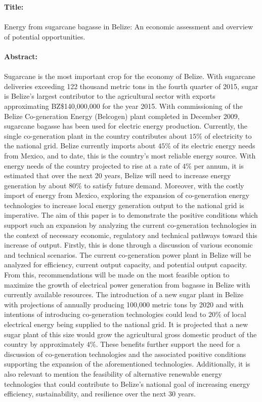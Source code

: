 \documentclass[12pt]{article}
\begin{document}
\noindent
\textbf{Title:} \\
\\Energy from sugarcane bagasse in Belize: An economic assessment and overview of potential opportunities. \\ \\
\noindent\textbf{Abstract:}\\
\\Sugarcane is the most important crop for the economy of Belize. With sugarcane deliveries exceeding 122 thousand metric tons in the fourth quarter of 2015, sugar is Belize's largest contributor to the agricultural sector with exports approximating BZ\$140,000,000 for the year 2015. With commissioning of the Belize Co-generation Energy (Belcogen) plant completed in December 2009, sugarcane bagasse has been used for electric energy production. Currently, the single co-generation plant in the country contributes about $15\%$ of electricity to the national grid. Belize currently imports about $45\%$ of its electric energy needs from Mexico, and to date, this is the country's most reliable energy source. With energy needs of the country projected to rise at a rate of $4\%$ per annum, it is estimated that over the next 20 years, Belize will need to increase energy generation by about 80$\%$ to satisfy future demand. Moreover, with the costly import of energy from Mexico, exploring the expansion of co-generation energy technologies to increase local energy generation output to the national grid is imperative. The aim of this paper is to demonstrate the positive conditions which support such an expansion by analyzing the current co-generation technologies in the context of necessary economic, regulatory and technical pathways toward this increase of output. Firstly, this is done through a discussion of various economic and technical scenarios. The current co-generation power plant in Belize will be analyzed for efficiency, current output capacity, and potential output capacity. From this, recommendations will be made on the most feasible option to maximize the growth of electrical power generation from bagasse in Belize with currently available resources. The introduction of a new sugar plant in Belize with projections of annually producing 100,000 metric tons by 2020 and with intentions of introducing co-generation technologies could lead to $20\%$ of local electrical energy being supplied to the national grid. It is projected that a new sugar plant of this size would grow the agricultural gross domestic product of the country by approximately $4\%$. These benefits further support the need for a discussion of co-generation technologies and the associated positive conditions supporting the expansion of the aforementioned technologies. Additionally, it is also relevant to mention the feasibility of alternative renewable energy technologies that could contribute to Belize's national goal of increasing energy efficiency, sustainability, and resilience over the next 30 years. 
\end{document}
